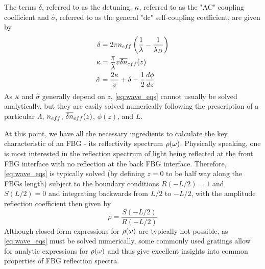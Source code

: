 %
The terms $\delta$, referred to as the detuning, $\kappa$, referred to as the "AC" coupling coefficient and $\hat{\sigma}$, referred to as the general "dc" self-coupling coefficient, are given by
%
\begin{align}
    \label{eq:delta}
    \delta &= 2 \pi n_{eff} \left( \frac{1}{\lambda} - \frac{1}{\lambda_D} \right) \\
    \label{eq:kappa}
    \kappa &= \frac{\pi}{\lambda} v \overline{\delta n}_{eff}(z)\\
    \label{eq:sigma}
    \hat{\sigma} &= \frac{2\kappa}{v} + \delta -\frac{1}{2}\frac{d\phi}{dz}
\end{align}
%
As $\kappa$ and $\hat{\sigma}$ generally depend on $z$, \eqref{eq:wave_eqs} cannot usually be solved analytically, but they are easily solved numerically following the prescription of a particular $\Lambda$, $n_{eff}$, $\overline{\delta n}_{eff}(z)$, $\phi(z)$, and $L$. 
%
\par
%
At this point, we have all the necessary ingredients to calculate the key characteristic of an FBG - its reflectivity spectrum $\rho(\omega)$. Physically speaking, one is most interested in the reflection spectrum of light being reflected at the front FBG interface with no reflection at the back FBG interface. Therefore, \eqref{eq:wave_eqs} is typically solved (by defining $z=0$ to be half way along the FBGs length) subject to the boundary conditions $R(-L/2)=1$ and $S(L/2)=0$ and integrating backwards from $L/2$ to $-L/2$, with the amplitude reflection coefficient then given by
%
\begin{equation}
\label{eq:rho}
    \rho = \frac{S(-L/2)}{R(-L/2)}
\end{equation}
%
Although closed-form expressions for $\rho(\omega)$ are typically not possible, as \eqref{eq:wave_eqs} must be solved numerically, some commonly used gratings allow for analytic expressions for $\rho(\omega)$ and thus give excellent insights into common properties of FBG reflection spectra.
%
%
